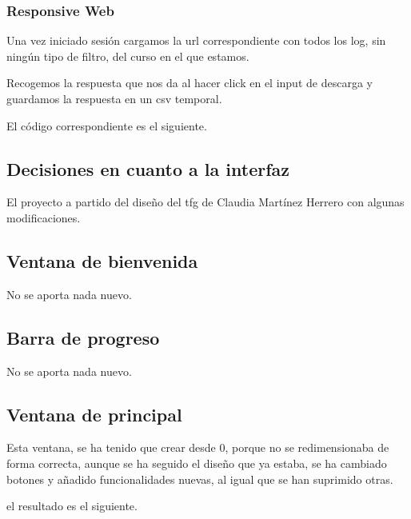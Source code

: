 
\subsubsection{Responsive Web}\label{responsive-web}

Una vez iniciado sesión cargamos la url correspondiente con todos los log, sin ningún tipo de filtro, del curso en el que estamos.

Recogemos la respuesta que nos da al hacer click en el input de descarga y guardamos la respuesta en un csv temporal.

El código correspondiente es el siguiente.



\subsection{Decisiones en cuanto a la interfaz}\label{decisiones-en-cuanto-a-la-interfaz}

El proyecto a partido del diseño del tfg de Claudia Martínez Herrero \cite{claudia} con algunas modificaciones.

\subsection{Ventana de bienvenida}\label{ventana-de-bienvenida}

No se aporta nada nuevo.

\subsection{Barra de progreso}\label{barra-de-progreso}

No se aporta nada nuevo.

\subsection{Ventana de principal}\label{ventana-de-principal}

Esta ventana, se ha tenido que crear desde 0, porque no se redimensionaba de forma correcta, aunque se ha seguido el diseño que ya estaba, se ha cambiado botones y añadido funcionalidades nuevas, al igual que se han suprimido otras. 

el resultado es el siguiente.


